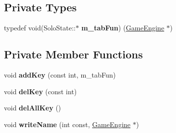 \subsection*{Private Types}
\begin{DoxyCompactItemize}
\item 
\hypertarget{class_solo_state_a186a2c56ec61865a1c7cea56576c0b85}{}typedef void(Solo\+State\+::$\ast$ {\bfseries m\+\_\+tab\+Fun}) (\hyperlink{class_game_engine}{Game\+Engine} $\ast$)\label{class_solo_state_a186a2c56ec61865a1c7cea56576c0b85}

\end{DoxyCompactItemize}
\subsection*{Private Member Functions}
\begin{DoxyCompactItemize}
\item 
\hypertarget{class_solo_state_afbf45ae8710864456e150d5b6ece5447}{}void {\bfseries add\+Key} (const int, m\+\_\+tab\+Fun)\label{class_solo_state_afbf45ae8710864456e150d5b6ece5447}

\item 
\hypertarget{class_solo_state_aa52cb8d3235bca4726e30bc1291ed0b5}{}void {\bfseries del\+Key} (const int)\label{class_solo_state_aa52cb8d3235bca4726e30bc1291ed0b5}

\item 
\hypertarget{class_solo_state_a123e2d17dcf15fbecb41a918d36d5a6b}{}void {\bfseries del\+All\+Key} ()\label{class_solo_state_a123e2d17dcf15fbecb41a918d36d5a6b}

\item 
\hypertarget{class_solo_state_ac70ed4d39a7c30f8f4dbd6d370953f2e}{}void {\bfseries write\+Name} (int const, \hyperlink{class_game_engine}{Game\+Engine} $\ast$)\label{class_solo_state_ac70ed4d39a7c30f8f4dbd6d370953f2e}

\end{DoxyCompactItemize}
